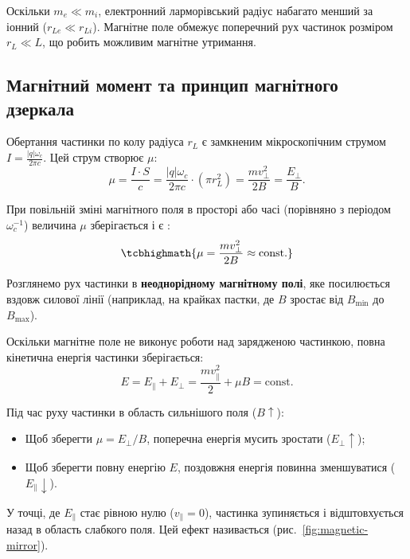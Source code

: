 Оскільки $m_e \ll m_i$, електронний ларморівський радіус набагато менший за іонний ($r_{Le} \ll r_{Li}$). Магнітне поле обмежує поперечний рух частинок розміром $r_L \ll L$, що робить можливим магнітне утримання.

\subsection{Магнітний момент та принцип магнітного дзеркала}

Обертання частинки по колу радіуса $r_L$ є замкненим мікроскопічним струмом $I = \frac{|q|\omega_c}{2\pi c}$. Цей струм створює  $\mu$:
\begin{equation}
	\mu = \frac{I \cdot S}{c} = \frac{|q|\omega_c}{2\pi c} \cdot (\pi r_L^2) = \frac{m v_\perp^2}{2B} = \frac{E_{\perp}}{B}.
\end{equation}

При повільній зміні магнітного поля в просторі або часі (порівняно з періодом $\omega_c^{-1}$) величина $\mu$ зберігається і є :
\begin{equation}
	\tcbhighmath{\mu = \frac{m v_\perp^2}{2B} \approx \text{const}.}
\end{equation}

Розглянемо рух частинки в \textbf{неоднорідному магнітному полі}, яке посилюється вздовж силової лінії (наприклад, на крайках пастки, де $B$ зростає від $B_{\min}$ до $B_{\max}$).

Оскільки магнітне поле не виконує роботи над зарядженою частинкою, повна кінетична енергія частинки зберігається:
\begin{equation}
	E = E_\parallel + E_\perp = \frac{m v_\parallel^2}{2} + \mu B = \text{const}.
\end{equation}

Під час руху частинки в область сильнішого поля ($B \uparrow$):
\begin{itemize}
	\item Щоб зберегти $\mu = E_\perp / B$, поперечна енергія мусить зростати ($E_\perp \uparrow$);
	\item Щоб зберегти повну енергію $E$, поздовжня енергія повинна зменшуватися ($E_\parallel \downarrow$).
\end{itemize}

У точці, де $E_\parallel$ стає рівною нулю ($v_\parallel = 0$), частинка зупиняється і відштовхується назад в область слабкого поля. Цей ефект називається  (рис.~\ref{fig:magnetic-mirror}).

